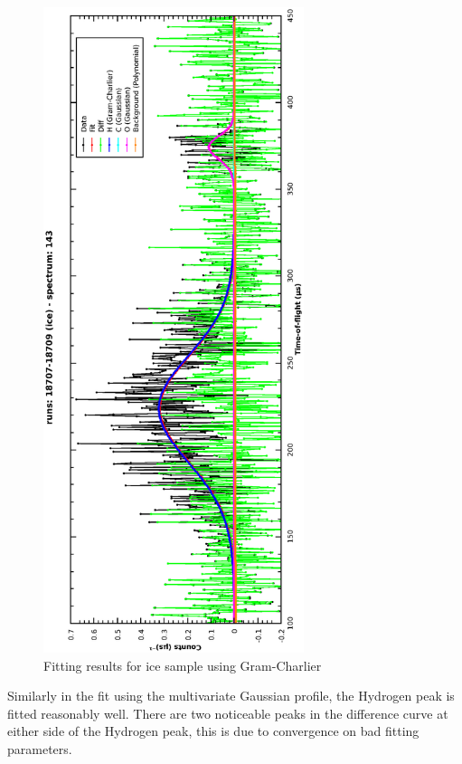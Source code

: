 \documentclass[a4paper]{article}
\begin{document}
\begin{figure}[h!]
  \centering
  \vspace{-60pt}
  \begin{turn}{-90}
    \includegraphics[width=0.68\textwidth]{graphics/cs_ice_gc.eps}
  \end{turn}
  \vspace{-60pt}
  \caption{Fitting results for ice sample using Gram-Charlier}
  \label{fig:gc_ice_fit}
\end{figure}
\FloatBarrier

Similarly in the fit using the multivariate Gaussian profile, the Hydrogen peak
is fitted reasonably well. There are two noticeable peaks in the difference
curve at either side of the Hydrogen peak, this is due to convergence on bad
fitting parameters.
\end{document}
